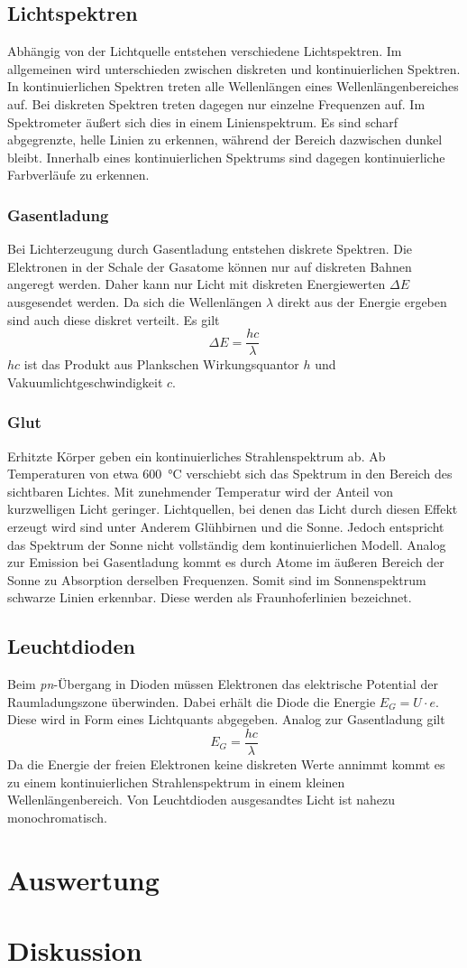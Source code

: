 \subsection{Lichtspektren}
Abhängig von der Lichtquelle entstehen verschiedene Lichtspektren. Im allgemeinen wird unterschieden zwischen diskreten und kontinuierlichen Spektren. In kontinuierlichen Spektren treten alle Wellenlängen eines Wellenlängenbereiches auf. Bei diskreten Spektren treten dagegen nur einzelne Frequenzen auf. Im Spektrometer äußert sich dies in einem Linienspektrum. Es sind  scharf abgegrenzte, helle Linien zu erkennen, während der Bereich dazwischen dunkel bleibt. Innerhalb eines kontinuierlichen Spektrums sind dagegen kontinuierliche Farbverläufe zu erkennen. 
\subsubsection{Gasentladung}
Bei Lichterzeugung durch Gasentladung entstehen diskrete Spektren. Die Elektronen in der Schale der Gasatome können nur auf diskreten Bahnen angeregt werden. Daher kann nur Licht mit diskreten Energiewerten $ \Delta E $ ausgesendet werden. Da sich die Wellenlängen $ \lambda $ direkt aus der Energie ergeben sind auch diese diskret verteilt. Es gilt
\begin{equation}
	\Delta E = \frac{hc}{\lambda}
\end{equation}
$ hc $ ist das Produkt aus Plankschen Wirkungsquantor $ h $ und Vakuumlichtgeschwindigkeit $ c $.

\subsubsection{Glut}
Erhitzte Körper geben ein kontinuierliches Strahlenspektrum ab. Ab Temperaturen von etwa \SI{600}{\degreeCelsius} verschiebt sich das Spektrum in den Bereich des sichtbaren Lichtes. Mit zunehmender Temperatur wird der Anteil von kurzwelligen Licht geringer. Lichtquellen, bei denen das Licht durch diesen Effekt erzeugt wird sind unter Anderem Glühbirnen und die Sonne. Jedoch entspricht das Spektrum der Sonne nicht vollständig dem kontinuierlichen Modell. Analog zur Emission bei Gasentladung kommt es durch Atome im äußeren Bereich der Sonne zu Absorption derselben Frequenzen. Somit sind im Sonnenspektrum schwarze Linien erkennbar. Diese werden als Fraunhoferlinien bezeichnet.

\subsection{Leuchtdioden}
Beim \textit{pn}-Übergang in Dioden müssen Elektronen das elektrische Potential der Raumladungszone überwinden. Dabei erhält die Diode die Energie $ E_G = U \cdot e $. Diese wird in Form eines Lichtquants abgegeben. Analog zur Gasentladung gilt
\begin{equation}
	E_G = \frac{hc}{\lambda}
\end{equation}
Da die Energie der freien Elektronen keine diskreten Werte annimmt kommt es zu einem kontinuierlichen Strahlenspektrum in einem kleinen Wellenlängenbereich. Von Leuchtdioden ausgesandtes Licht ist nahezu monochromatisch.
\newpage
\section{Auswertung}

\newpage
\section{Diskussion} 
